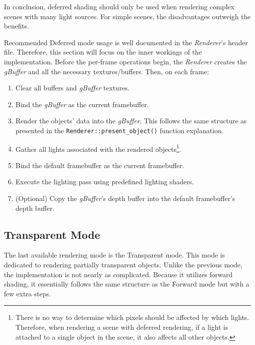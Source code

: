 \documentclass[
  digital,     %
  oneside,     %
  nosansbold,  %
  nocolorbold, %
  lof,         %
  lot,         %
]{fithesis4}
\begin{document}
In conclusion, deferred shading should only be used when rendering complex scenes with many light sources.
For simple scenes, the disadvantages outweigh the benefits.

Recommended Deferred mode usage is well documented in the \textit{Renderer}'s header file.
Therefore, this section will focus on the inner workings
of the implementation. Before the per-frame operations begin,
the \textit{Renderer} creates the \emph{gBuffer} and all the necessary textures/buffers. Then, on each frame:
\begin{enumerate}
    \item Clear all buffers and \emph{gBuffer} textures.
    
    \item Bind the \emph{gBuffer} as the current framebuffer.
    
    \item Render the objects' data into the \emph{gBuffer}. This follows the same structure as presented in the
    \verb|Renderer::present_object()| function explanation.

    \item Gather all lights associated with the rendered objects\footnote{There is no way to determine
    which pixels should be affected by which lights. Therefore, when rendering a scene with deferred rendering,
    if a light is attached to a single object in the scene, it also affects all other objects.}.

    \item Bind the default framebuffer as the current framebuffer.

    \item Execute the lighting pass using predefined lighting shaders.

    \item (Optional) Copy the \emph{gBuffer}'s depth buffer into the default framebuffer's depth buffer.
\end{enumerate}

\subsection{Transparent Mode}\label{sec:transparent-mode}
The last available rendering mode is the Transparent mode. This mode is dedicated to rendering partially
transparent objects. Unlike the previous mode, the implementation is not nearly as complicated.
Because it utilizes forward shading, it essentially follows the same structure as the Forward mode
but with a few extra steps.
\end{document}
